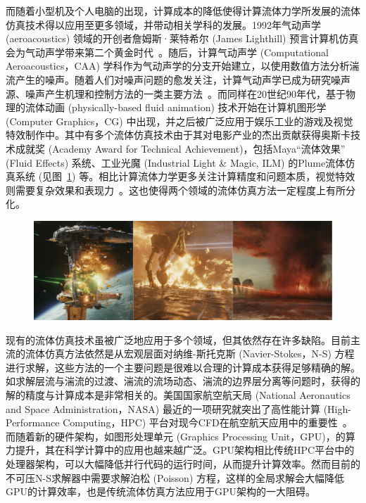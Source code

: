 而随着小型机及个人电脑的出现，计算成本的降低使得计算流体力学所发展的流体仿真技术得以应用至更多领域，并带动相关学科的发展。1992年气动声学 (aeroacoustics) 领域的开创者詹姆斯·莱特希尔 (James Lighthill) 预言计算机仿真会为气动声学带来第二个黄金时代~\citep{hardin1993computational}。随后，计算气动声学 (Computational Aeroacoustics，CAA) 学科作为气动声学的分支开始建立，以使用数值方法分析湍流产生的噪声。随着人们对噪声问题的愈发关注，计算气动声学已成为研究噪声源、噪声产生机理和控制方法的一类主要方法~\citep{RN177}。而同样在20世纪90年代，基于物理的流体动画 (physically-based fluid animation) 技术开始在计算机图形学 (Computer Graphics，CG) 中出现，并之后被广泛应用于娱乐工业的游戏及视觉特效制作中。其中有多个流体仿真技术由于其对电影产业的杰出贡献获得奥斯卡技术成就奖 (Academy Award for Technical Achievement)，包括Maya“流体效果” (Fluid Effects) 系统、工业光魔 (Industrial Light \& Magic, ILM) 的Plume流体仿真系统 (见图~\ref{img:star_wars}) 等。相比计算流体力学更多关注计算精度和问题本质，视觉特效则需要复杂效果和表现力~\citep{C1}。这也使得两个领域的流体仿真方法一定程度上有所分化。

\begin{figure}[htbp]
  \centering
    \includegraphics[width=0.99\columnwidth]{figures/star_wars.png}
  \label{img:star_wars}
\end{figure}

现有的流体仿真技术虽被广泛地应用于多个领域，但其依然存在许多缺陷。目前主流的流体仿真方法依然是从宏观层面对纳维-斯托克斯 (Navier-Stokes，N-S) 方程进行求解，这些方法的一个主要问题是很难以合理的计算成本获得足够精确的解。如求解层流与湍流的过渡、湍流的流场动态、湍流的边界层分离等问题时，获得的解的精度与计算成本是非常相关的。美国国家航空航天局 (National Aeronautics and Space Administration，NASA) 最近的一项研究就突出了高性能计算 (High-Performance Computing，HPC) 平台对现今CFD在航空航天应用中的重要性~\citep{slotnick2014cfd}。而随着新的硬件架构，如图形处理单元 (Graphics Processing Unit，GPU)，的算力提升，其在科学计算中的应用也越来越广泛。GPU架构相比传统HPC平台中的处理器架构，可以大幅降低并行代码的运行时间，从而提升计算效率。然而目前的不可压N-S求解器中需要求解泊松 (Poisson) 方程，这样的全局求解会大幅降低GPU的计算效率，也是传统流体仿真方法应用于GPU架构的一大阻碍。

